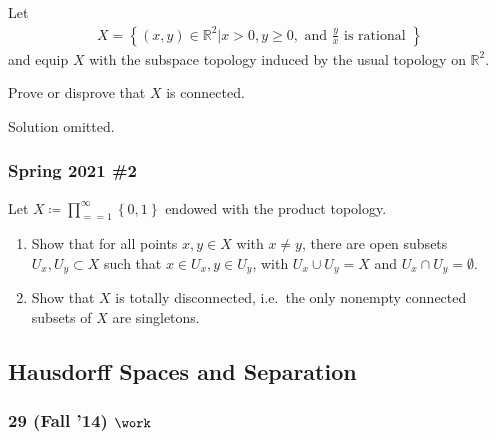 \begin{problem}[?]

Let
\begin{align*} X=\left\{(x, y) \in \mathbb{R}^{2} | x>0, y \geq 0, \text { and } \frac{y}{x} \text { is rational }\right\} \end{align*}
and equip \(X\) with the subspace topology induced by the usual topology
on \({\mathbb{R}}^2\).

Prove or disprove that \(X\) is connected.

\end{problem}


Solution omitted.

\hypertarget{spring-2021-2}{%
\subsubsection{Spring 2021 \#2}\label{spring-2021-2}}

\begin{problem}[Spring 2021, 2]

Let \(X \coloneqq\prod_{==1}^{\infty} \left\{{ 0, 1 }\right\}\) endowed
with the product topology.

\begin{enumerate}
\def\labelenumi{\alph{enumi}.}
\item
  Show that for all points \(x,y\in X\) with \(x\neq y\), there are open
  subsets \(U_x, U_y \subset X\) such that \(x\in U_x, y\in U_y\), with
  \(U_x \cup U_y = X\) and \(U_x \cap U_y = \emptyset\).
\item
  Show that \(X\) is totally disconnected, i.e.~the only nonempty
  connected subsets of \(X\) are singletons.
\end{enumerate}

\end{problem}

\hypertarget{hausdorff-spaces-and-separation}{%
\subsection{Hausdorff Spaces and
Separation}\label{hausdorff-spaces-and-separation}}

\hypertarget{fall-14-work-1}{%
\subsubsection{\texorpdfstring{29 (Fall '14)
\(\work\)}{29 (Fall '14) \textbackslash work}}\label{fall-14-work-1}}

